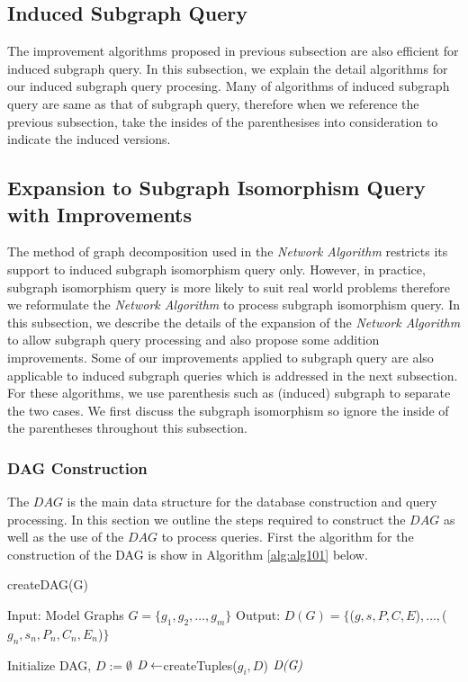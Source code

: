 \subsection{Induced Subgraph Query}
The improvement algorithms proposed in previous subsection are also efficient for induced subgraph query. In this subsection, we explain the detail algorithms for our induced subgraph query procesing. Many of algorithms of induced subgraph query are same as that of subgraph query, therefore when we reference the previous subsection, take the insides of the parenthesises into consideration to indicate the induced versions.

\subsection{Expansion to Subgraph Isomorphism Query with Improvements}
The method of graph decomposition used in the \textit{Network Algorithm} restricts its  support to induced subgraph isomorphism query only. However, in practice,  subgraph isomorphism query is more likely to suit real world problems therefore we reformulate the \textit{Network Algorithm} to process subgraph isomorphism query. In this subsection, we describe the details of the expansion of the \textit{Network Algorithm} to allow subgraph query processing and also propose some addition improvements. Some of our improvements applied to subgraph query are also applicable to induced subgraph queries which is addressed in the next subsection. For these algorithms, we use parenthesis such as (induced) subgraph to separate the two cases. We first discuss the subgraph isomorphism so ignore the inside of the parentheses throughout this subsection.

\subsubsection{DAG Construction}
The $DAG$ is the main data structure for the database construction and query processing. In this section we outline the steps required to construct 
the $DAG$ as well as the use of the $DAG$ to process queries. First the algorithm for the construction of the DAG is show in Algorithm \ref{alg:alg101} below.


\begin{algorithm}
\caption{createDAG(G)}
\label{alg:alg101}
\begin{algorithmic}
\STATE Input: Model Graphs $G =\{g_1,g_2,\dots,g_m\}$
\STATE Output: $D(G)= \{$($g,s,P,C,E$)$,\ldots,$($g_n,s_n,P_n,C_n,E_n$)$ \}$
\end{algorithmic}
\begin{algorithmic}[1]
\STATE Initialize DAG, $D:=\emptyset$
 \STATE  $\emph{D} \leftarrow $createTuples($g_i,D$)
\ENDFOR
\RETURN $\emph{D(G)}$
\end{algorithmic}
\end{algorithm}


